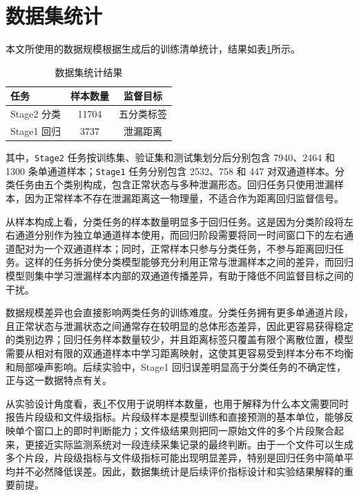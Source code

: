 \section{数据集统计}

本文所使用的数据规模根据生成后的训练清单统计，结果如表\ref{tab:dataset_stats}所示。

\begin{table}[!htbp]
  \centering
  \caption{数据集统计结果}
  \label{tab:dataset_stats}
  \vspace{0.5em}
  \wuhao
  \begin{tabular}{lcc}
    \toprule
    任务 & 样本数量 & 监督目标 \\
    \midrule
    Stage2 分类 & 11704 & 五分类标签 \\
    Stage1 回归 & 3737 & 泄漏距离 \\
    \bottomrule
  \end{tabular}
\end{table}

其中，\texttt{Stage2} 任务按训练集、验证集和测试集划分后分别包含 7940、2464 和 1300 条单通道样本；\texttt{Stage1} 任务分别包含 2532、758 和 447 对双通道样本。分类任务由五个类别构成，包含正常状态与多种泄漏形态。回归任务只使用泄漏样本，因为正常样本不存在泄漏距离这一物理量，不适合作为距离回归监督信号。

从样本构成上看，分类任务的样本数量明显多于回归任务。这是因为分类阶段将左右通道分别作为独立单通道样本使用，而回归阶段需要将同一时间窗口下的左右通道配对为一个双通道样本；同时，正常样本只参与分类任务，不参与距离回归任务。这样的任务拆分使分类模型能够充分利用正常与泄漏样本之间的差异，而回归模型则集中学习泄漏样本内部的双通道传播差异，有助于降低不同监督目标之间的干扰。

数据规模差异也会直接影响两类任务的训练难度。分类任务拥有更多单通道片段，且正常状态与泄漏状态之间通常存在较明显的总体形态差异，因此更容易获得稳定的类别边界；回归任务样本数量较少，并且距离标签只覆盖有限个离散位置，模型需要从相对有限的双通道样本中学习距离映射，这使其更容易受到样本分布不均衡和局部噪声影响。后续实验中，Stage1 回归误差明显高于分类任务的不确定性，正与这一数据特点有关。

从实验设计角度看，表\ref{tab:dataset_stats}不仅用于说明样本数量，也用于解释为什么本文需要同时报告片段级和文件级指标。片段级样本是模型训练和直接预测的基本单位，能够反映单个窗口上的即时判断能力；文件级结果则把同一原始文件的多个片段聚合起来，更接近实际监测系统对一段连续采集记录的最终判断。由于一个文件可以生成多个片段，片段级指标与文件级指标可能出现明显差异，特别是回归任务中简单平均并不必然降低误差。因此，数据集统计是后续评价指标设计和实验结果解释的重要前提。


